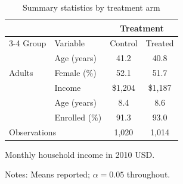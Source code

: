 \begin{table}[htbp]
\centering
\caption{Summary statistics by treatment arm}
\label{tab:summary}
\begin{threeparttable}
\begin{tabular}{@{}llcc@{}}
\toprule
 & & \multicolumn{2}{c}{Treatment} \\
\cmidrule(lr){3-4}
Group & Variable & Control & Treated \\
\midrule
\multirow{3}{*}{Adults} & Age (years) & 41.2 & 40.8 \\
 & Female (\%) & 52.1 & 51.7 \\
 & Income\tnote{a} & \$1,204 & \$1,187 \\
\addlinespace
\multirow{2}{*}{Children} & Age (years) & 8.4 & 8.6 \\
 & Enrolled (\%) & 91.3 & 93.0 \\
\midrule
\multicolumn{2}{l}{Observations} & 1,020 & 1,014 \\
\bottomrule
\end{tabular}
\begin{tablenotes}
\footnotesize
\item[a] Monthly household income in 2010 USD.
\item Notes: Means reported; $\alpha = 0.05$ throughout.
\end{tablenotes}
\end{threeparttable}
\end{table}
